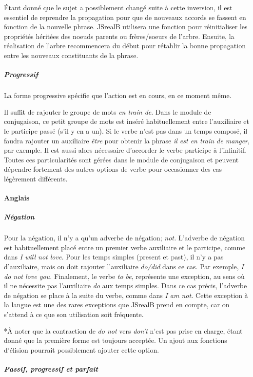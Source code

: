 \documentclass[11pt]{article} %
\begin{document}
Étant donné que le sujet a possiblement changé suite à
cette inversion, il est essentiel de reprendre la propagation
pour que de nouveaux accords se fassent en fonction de la nouvelle
phrase. JSrealB utilisera une fonction pour réinitialiser les propriétés
héritées des noeuds parents ou frères/soeurs de l'arbre. Ensuite,
la réalisation de l'arbre recommencera du début pour rétablir la bonne
propagation entre les nouveaux constituants de la phrase.

\subparagraph{Progressif}

La forme progressive spécifie que l'action est en cours, en ce moment même. 

Il suffit de rajouter le groupe de
mots \emph{en train de}. Dans le module de conjugaison, ce petit groupe de
mots est inséré habituellement entre l'auxiliaire et le participe
passé (s'il y en a un). Si le verbe n'est pas dans un temps composé,
il faudra rajouter un auxiliaire \emph{être }pour obtenir la phrase
\emph{il est en train de manger}, par exemple. Il est aussi alors
nécessaire d'accorder le verbe participe à l'infinitif. Toutes ces
particularités sont gérées dans le module de conjugaison et peuvent
dépendre fortement des autres options de verbe pour occasionner des
cas légèrement différents.

\paragraph{Anglais}

\subparagraph{Négation}

Pour la négation, il n'y a qu'un adverbe de négation; 
\emph{not. }L'adverbe de négation est habituellement placé entre un
premier verbe auxiliaire et le participe, comme dans \emph{I will
not love. }Pour les temps simples (present et past), il n'y a pas d'auxiliaire,
mais on doit rajouter l'auxiliaire \emph{do/did} dans ce cas. Par
exemple, \emph{I do not love you. }Finalement, le verbe \emph{to be},
représente une exception, au sens où il ne nécessite pas l'auxiliaire
\emph{do }aux temps simples. Dans ce cas précis, l'adverbe de négation
se place à la suite du verbe, comme dans \emph{I am not.} Cette exception
à la langue est une des rares exceptions que JSrealB prend en compte,
car on s'attend à ce que son utilisation soit fréquente.

{*}À noter que la contraction de \emph{do not }vers \emph{don't} n'est
pas prise en charge, étant donné que la première forme est toujours
acceptée. Un ajout aux fonctions d'élision pourrait possiblement ajouter
cette option.
\subparagraph{Passif, progressif et parfait}
\end{document}
